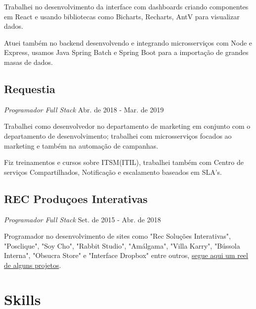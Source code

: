 \documentclass[a4paper,10pt]{article}
\begin{document}
Trabalhei no desenvolvimento da interface com dashboards
criando componentes em React e usando bibliotecas como
Bicharts, Recharts, AntV para visualizar dados.

Atuei também no backend desenvolvendo e integrando microsserviços com Node e Express,
usamos Java Spring Batch e Spring Boot para a importação de grandes masas de dados.

\clearpage

\subsection*{Requestia}
\textcolor{corSubSection}{\emph{Programador Full Stack}}
\hfill \textcolor{corSubSection}{Abr. de 2018 - Mar. de 2019}

Trabalhei como desenvolvedor no departamento de marketing
em conjunto com o departamento de desenvolvimento;
trabalhei com microsserviços focados ao marketing
e também na automação de campanhas.

Fiz treinamentos e cursos sobre ITSM(ITIL),
trabalhei também com Centro de serviços Compartilhados,
Notificação e escalamento baseados em SLA's.

\subsection*{REC Produçoes Interativas}
\textcolor{corSubSection}{\emph{Programador Full Stack}}
\hfill \textcolor{corSubSection}{Set. de 2015 - Abr. de 2018}

Programador no desenvolvimento de sites como "Rec Soluções Interativas",
"Posclique", "Soy Cho", "Rabbit Studio", "Amálgama", "Villa Karry",
"Bússola Interna", "Obsucra Store" e "Interface Dropbox" entre outros,
\href{https://www.youtube.com/watch?v=V_ahsuHgIoE}{segue aqui um reel de alguns projetos}.

%


\section*{Skills}
\noindent\makebox[\linewidth]{\rule{\linewidth}{0.1mm}\textcolor{corLarge}{}}
\end{document}
